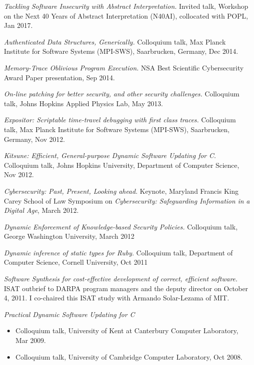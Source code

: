\documentclass[11pt]{article}
\begin{document}
\begin{description}
    \item
        \textit{Tackling Software Insecurity with Abstract Interpretation.} Invited talk, Workshop on the Next 40 Years of Abstract Interpretation (N40AI), collocated with POPL, Jan 2017.
   \item
        \textit{Authenticated Data Structures, Generically.} Colloquium talk, Max Planck Institute for Software Systems (MPI-SWS), Saarbrucken, Germany, Dec 2014. 
    \item
        \textit{Memory-Trace Oblivious Program Execution.} NSA Best Scientific Cybersecurity Award Paper presentation, Sep 2014.
    \item
        \textit{On-line patching for better security, and other security challenges.} Colloquium talk, Johns Hopkins Applied Physics Lab, May 2013. 
    \item
        \textit{Expositor: Scriptable time-travel debugging with first class traces.} Colloquium talk, Max Planck Institute for Software Systems (MPI-SWS), Saarbrucken, Germany, Nov 2012.
    \item
        \textit{Kitsune: Efficient, General-purpose Dynamic Software Updating for C.} Colloquium talk, Johns Hopkins University, Department of Computer Science, Nov 2012.
    \item
        \textit{Cybersecurity: Past, Present, Looking ahead.} Keynote, Maryland Francis King Carey School of Law Symposium on \textit{Cybersecurity: Safeguarding Information in a Digital Age}, March 2012.
    \item
       \textit{Dynamic Enforcement of Knowledge-based Security Policies.} Colloquium talk, George Washington University, March 2012
    \item
        \textit{Dynamic inference of static types for Ruby.} Colloquium talk, Department of Computer Science, Cornell University, Oct 2011
    \item
        \textit{Software Synthesis for cost-effective development of correct, efficient software.} ISAT outbrief to DARPA program managers and the deputy director on October 4, 2011. I co-chaired this ISAT study with Armando Solar-Lezama of MIT. 
    \item
        \textit{Practical Dynamic Software Updating for C}
        \begin{itemize}
            \item
                Colloquium talk, University of Kent at Canterbury Computer Laboratory, Mar 2009.
            \item
                Colloquium talk, University of Cambridge Computer Laboratory, Oct 2008.

\end{itemize}
\end{description}
\end{document}
